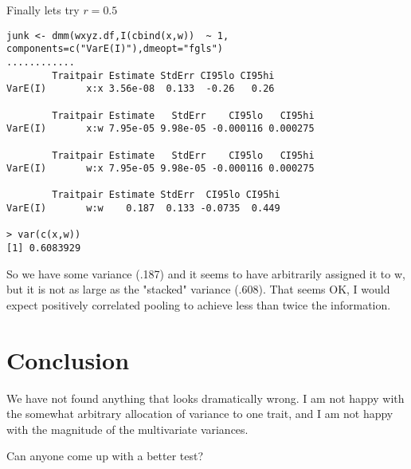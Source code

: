 \documentclass{report}  %
\begin{document}
Finally lets try $r=0.5$
\begin{verbatim}
junk <- dmm(wxyz.df,I(cbind(x,w))  ~ 1, components=c("VarE(I)"),dmeopt="fgls")
............
        Traitpair Estimate StdErr CI95lo CI95hi
VarE(I)       x:x 3.56e-08  0.133  -0.26   0.26

        Traitpair Estimate   StdErr    CI95lo   CI95hi
VarE(I)       x:w 7.95e-05 9.98e-05 -0.000116 0.000275

        Traitpair Estimate   StdErr    CI95lo   CI95hi
VarE(I)       w:x 7.95e-05 9.98e-05 -0.000116 0.000275

        Traitpair Estimate StdErr  CI95lo CI95hi
VarE(I)       w:w    0.187  0.133 -0.0735  0.449

> var(c(x,w))
[1] 0.6083929
\end{verbatim}
 So we have some variance (.187) and it seems to have arbitrarily assigned it to w, but it is not as large as the "stacked" variance (.608). That seems OK, I would expect positively correlated pooling to achieve less than twice the information. 

\section{Conclusion}
We have not found anything that looks dramatically wrong. I am not happy with the somewhat arbitrary allocation of variance to one trait, and I am not happy with the magnitude of the multivariate variances. 

Can anyone come up with a better test?
\end{document}
